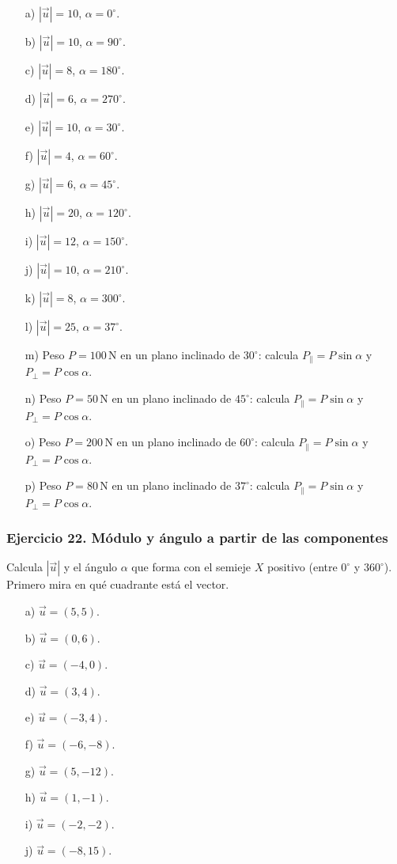 \begin{enumerate}
    \item[a)] $|\vec{u}|=10$, $\alpha=0^\circ$.
    \item[b)] $|\vec{u}|=10$, $\alpha=90^\circ$.
    \item[c)] $|\vec{u}|=8$, $\alpha=180^\circ$.
    \item[d)] $|\vec{u}|=6$, $\alpha=270^\circ$.
    \item[e)] $|\vec{u}|=10$, $\alpha=30^\circ$.
    \item[f)] $|\vec{u}|=4$, $\alpha=60^\circ$.
    \item[g)] $|\vec{u}|=6$, $\alpha=45^\circ$.
    \item[h)] $|\vec{u}|=20$, $\alpha=120^\circ$.
    \item[i)] $|\vec{u}|=12$, $\alpha=150^\circ$.
    \item[j)] $|\vec{u}|=10$, $\alpha=210^\circ$.
    \item[k)] $|\vec{u}|=8$, $\alpha=300^\circ$.
    \item[l)] $|\vec{u}|=25$, $\alpha=37^\circ$.
    \item[m)] Peso $P=100\,\mathrm{N}$ en un plano inclinado de $30^\circ$:
    calcula $P_{\parallel}=P\sin\alpha$ y $P_{\perp}=P\cos\alpha$.
    \item[n)] Peso $P=50\,\mathrm{N}$ en un plano inclinado de $45^\circ$:
    calcula $P_{\parallel}=P\sin\alpha$ y $P_{\perp}=P\cos\alpha$.
    \item[o)] Peso $P=200\,\mathrm{N}$ en un plano inclinado de $60^\circ$:
    calcula $P_{\parallel}=P\sin\alpha$ y $P_{\perp}=P\cos\alpha$.
    \item[p)] Peso $P=80\,\mathrm{N}$ en un plano inclinado de $37^\circ$:
    calcula $P_{\parallel}=P\sin\alpha$ y $P_{\perp}=P\cos\alpha$.
\end{enumerate}

\subsubsection*{Ejercicio 22. Módulo y ángulo a partir de las componentes}

Calcula $|\vec{u}|$ y el ángulo $\alpha$ que forma con el semieje $X$ positivo (entre $0^\circ$ y $360^\circ$). Primero mira en qué cuadrante está el vector.

\begin{enumerate}
    \item[a)] $\vec{u}=(5,5)$.
    \item[b)] $\vec{u}=(0,6)$.
    \item[c)] $\vec{u}=(-4,0)$.
    \item[d)] $\vec{u}=(3,4)$.
    \item[e)] $\vec{u}=(-3,4)$.
    \item[f)] $\vec{u}=(-6,-8)$.
    \item[g)] $\vec{u}=(5,-12)$.
    \item[h)] $\vec{u}=(1,-1)$.
    \item[i)] $\vec{u}=(-2,-2)$.
    \item[j)] $\vec{u}=(-8,15)$.
\end{enumerate}

